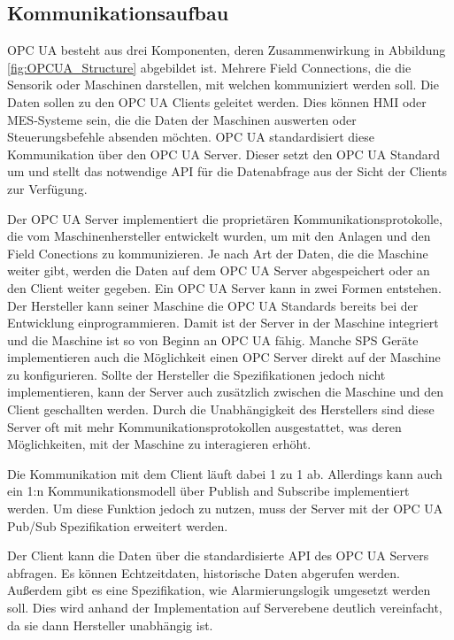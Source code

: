 \documentclass[a4paper, 12pt, oneside, toc=listofnumbered, bibliography=totoc]{scrbook}
\begin{document}
		\subsection{Kommunikationsaufbau} 
		
		OPC UA besteht aus drei Komponenten, deren Zusammenwirkung in Abbildung \ref{fig:OPCUA_Structure} abgebildet ist. Mehrere Field Connections, die die Sensorik oder Maschinen darstellen, mit welchen kommuniziert werden soll. Die Daten sollen zu den OPC UA Clients geleitet werden. Dies können \ac{HMI} oder MES-Systeme sein, die die Daten der Maschinen auswerten oder Steuerungsbefehle absenden möchten. OPC UA standardisiert diese Kommunikation über den OPC UA Server. Dieser setzt den OPC UA Standard um und stellt das notwendige \ac{API} für die Datenabfrage aus der Sicht der Clients zur Verfügung. \cite{rinke_was_2022}
		
		Der OPC UA Server implementiert die proprietären Kommunikationsprotokolle, die vom Maschinenhersteller entwickelt wurden, um mit den Anlagen und den Field Conections zu kommunizieren. Je nach Art der Daten, die die Maschine weiter gibt, werden die Daten auf dem OPC UA Server abgespeichert oder an den Client weiter gegeben. Ein OPC UA Server kann in zwei Formen entstehen. Der Hersteller kann seiner Maschine die OPC UA Standards bereits bei der Entwicklung einprogrammieren. Damit ist der Server in der Maschine integriert und die Maschine ist so von Beginn an OPC UA fähig. Manche SPS Geräte implementieren auch die Möglichkeit einen OPC Server direkt auf der Maschine zu konfigurieren. Sollte der Hersteller die Spezifikationen jedoch nicht implementieren, kann der Server auch zusätzlich zwischen die Maschine und den Client geschallten werden. Durch die Unabhängigkeit des Herstellers sind diese Server oft mit mehr Kommunikationsprotokollen ausgestattet, was deren Möglichkeiten, mit der Maschine zu interagieren erhöht. \cite{rinke_was_2022}
		
		Die Kommunikation mit dem Client läuft dabei 1 zu 1 ab. Allerdings kann auch ein 1:n Kommunikationsmodell über Publish and Subscribe implementiert werden. Um diese Funktion jedoch zu nutzen, muss der Server mit der OPC UA Pub/Sub Spezifikation erweitert werden. \cite{mielebacher_verteilte_2021}
		
		Der Client kann die Daten über die standardisierte API des OPC UA Servers abfragen. Es können Echtzeitdaten, historische Daten abgerufen werden. Außerdem gibt es eine Spezifikation, wie Alarmierungslogik umgesetzt werden soll. Dies wird anhand der Implementation auf Serverebene deutlich vereinfacht, da sie dann Hersteller unabhängig ist. \cite{rinke_was_2022}
		
\end{document}
